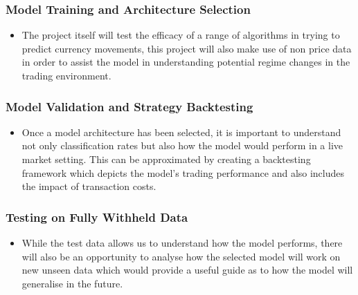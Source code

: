 \documentclass[11pt]{article}
\begin{document}
 \subsubsection{Model Training and Architecture Selection}
	\begin{itemize}
	\item The project itself will test the efficacy of a range of algorithms in trying to predict currency movements, this project will also make use of non price data in order to assist the model in understanding potential regime changes in the trading environment. 
	\end{itemize}
 \subsubsection{Model Validation and Strategy Backtesting}
	\begin{itemize}
	\item Once a model architecture has been selected, it is important to understand not only classification rates but also how the model would perform in a live market setting. This can be approximated by creating a backtesting framework which depicts the model's trading performance and also includes the impact of transaction costs.
	\end{itemize}
\subsubsection{Testing on Fully Withheld Data}
	\begin{itemize}
	\item While the test data allows us to understand how the model performs, there will also be an opportunity to analyse how the selected model will work on new unseen data which would provide a useful guide as to how the model will generalise in the future.
	\end{itemize}
\end{document}
